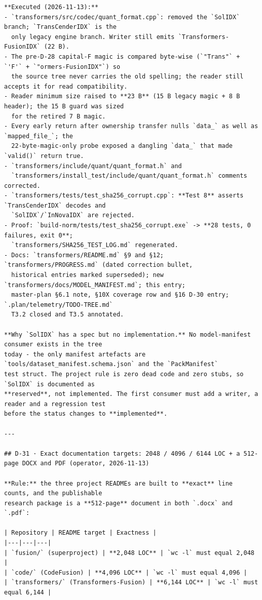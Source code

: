 \begin{verbatim}
**Executed (2026-11-13):**
- `transformers/src/codec/quant_format.cpp`: removed the `SolIDX` branch; `TransCenderIDX` is the
  only legacy engine branch. Writer still emits `Transformers-FusionIDX` (22 B).
- The pre-D-28 capital-F magic is compared byte-wise (`"Trans"` + `'F'` + `"ormers-FusionIDX"`) so
  the source tree never carries the old spelling; the reader still accepts it for read compatibility.
- Reader minimum size raised to **23 B** (15 B legacy magic + 8 B header); the 15 B guard was sized
  for the retired 7 B magic.
- Every early return after ownership transfer nulls `data_` as well as `mapped_file_`; the
  22-byte-magic-only probe exposed a dangling `data_` that made `valid()` return true.
- `transformers/include/quant/quant_format.h` and
  `transformers/install_test/include/quant/quant_format.h` comments corrected.
- `transformers/tests/test_sha256_corrupt.cpp`: **Test 8** asserts `TransCenderIDX` decodes and
  `SolIDX`/`InNovaIDX` are rejected.
- Proof: `build-norm/tests/test_sha256_corrupt.exe` -> **28 tests, 0 failures, exit 0**;
  `transformers/SHA256_TEST_LOG.md` regenerated.
- Docs: `transformers/README.md` §9 and §12; `transformers/PROGRESS.md` (dated correction bullet,
  historical entries marked superseded); new `transformers/docs/MODEL_MANIFEST.md`; this entry;
  master-plan §6.1 note, §10X coverage row and §16 D-30 entry; `.plan/telemetry/TODO-TREE.md`
  T3.2 closed and T3.5 annotated.

**Why `SolIDX` has a spec but no implementation.** No model-manifest consumer exists in the tree
today - the only manifest artefacts are `tools/dataset_manifest.schema.json` and the `PackManifest`
test struct. The project rule is zero dead code and zero stubs, so `SolIDX` is documented as
**reserved**, not implemented. The first consumer must add a writer, a reader and a regression test
before the status changes to **implemented**.

---

## D-31 · Exact documentation targets: 2048 / 4096 / 6144 LOC + a 512-page DOCX and PDF (operator, 2026-11-13)

**Rule:** the three project READMEs are built to **exact** line counts, and the publishable
research package is a **512-page** document in both `.docx` and `.pdf`:

| Repository | README target | Exactness |
|---|---|---|
| `fusion/` (superproject) | **2,048 LOC** | `wc -l` must equal 2,048 |
| `code/` (CodeFusion) | **4,096 LOC** | `wc -l` must equal 4,096 |
| `transformers/` (Transformers-Fusion) | **6,144 LOC** | `wc -l` must equal 6,144 |


\end{verbatim}
